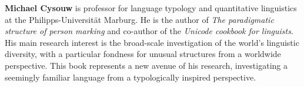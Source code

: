 

\noindent\textbf{Michael Cysouw} is professor for language typology and quantitative linguistics at the Philipps-Universität Marburg. He is the author of \textit{The paradigmatic structure of person marking} and co-author of the \textit{Unicode cookbook for linguists}. His main research interest is the broad-scale investigation of the world's linguistic diversity, with a particular fondness for unusual structures from a worldwide perspective. This book represents a new avenue of his research, investigating a seemingly familiar language from a typologically inspired perspective.
